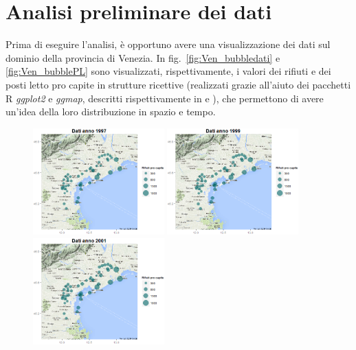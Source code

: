 \documentclass[a4paper,11pt,twoside,openright]{book}							%
\begin{document}
\section{Analisi preliminare dei dati}
Prima di eseguire l'analisi, è opportuno avere una visualizzazione dei dati sul dominio della provincia di Venezia. In fig.~\ref{fig:Ven_bubbledati} e \ref{fig:Ven_bubblePL} sono visualizzati, rispettivamente, i valori dei rifiuti e dei posti letto pro capite in strutture ricettive (realizzati grazie all'aiuto dei pacchetti R \textit{ggplot2} e \textit{ggmap}, descritti rispettivamente in \cite{package:ggplot2} e \cite{package:ggmap}), che permettono di avere un'idea della loro distribuzione in spazio e tempo.
\newpage
\begin{figure}[H]
	\centering
	\includegraphics[trim=0cm 0cm 0cm 0cm,clip=true,width=0.45\textwidth]{Immagini/venezia_dati/Dati1997.png}
	\includegraphics[trim=0cm 0cm 0cm 0cm,clip=true,width=0.45\textwidth]{Immagini/venezia_dati/Dati1999.png}
	\includegraphics[trim=0cm 0cm 0cm 0cm,clip=true,width=0.45\textwidth]{Immagini/venezia_dati/Dati2001.png}

\end{figure}
\end{document}
